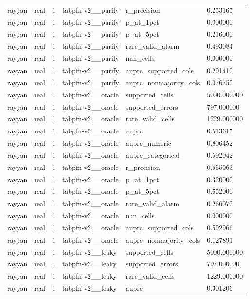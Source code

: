 \begin{tabular}{llllll}
rayyan & real & 1 & tabpfn-v2\_\_purify & r\_precision & 0.253165 \\
rayyan & real & 1 & tabpfn-v2\_\_purify & p\_at\_1pct & 0.000000 \\
rayyan & real & 1 & tabpfn-v2\_\_purify & p\_at\_5pct & 0.216000 \\
rayyan & real & 1 & tabpfn-v2\_\_purify & rare\_valid\_alarm & 0.493084 \\
rayyan & real & 1 & tabpfn-v2\_\_purify & nan\_cells & 0.000000 \\
rayyan & real & 1 & tabpfn-v2\_\_purify & auprc\_supported\_cols & 0.291410 \\
rayyan & real & 1 & tabpfn-v2\_\_purify & auprc\_nonmajority\_cols & 0.076752 \\
rayyan & real & 1 & tabpfn-v2\_\_oracle & supported\_cells & 5000.000000 \\
rayyan & real & 1 & tabpfn-v2\_\_oracle & supported\_errors & 797.000000 \\
rayyan & real & 1 & tabpfn-v2\_\_oracle & rare\_valid\_cells & 1229.000000 \\
rayyan & real & 1 & tabpfn-v2\_\_oracle & auprc & 0.513617 \\
rayyan & real & 1 & tabpfn-v2\_\_oracle & auprc\_numeric & 0.806452 \\
rayyan & real & 1 & tabpfn-v2\_\_oracle & auprc\_categorical & 0.592042 \\
rayyan & real & 1 & tabpfn-v2\_\_oracle & r\_precision & 0.655063 \\
rayyan & real & 1 & tabpfn-v2\_\_oracle & p\_at\_1pct & 0.320000 \\
rayyan & real & 1 & tabpfn-v2\_\_oracle & p\_at\_5pct & 0.652000 \\
rayyan & real & 1 & tabpfn-v2\_\_oracle & rare\_valid\_alarm & 0.266070 \\
rayyan & real & 1 & tabpfn-v2\_\_oracle & nan\_cells & 0.000000 \\
rayyan & real & 1 & tabpfn-v2\_\_oracle & auprc\_supported\_cols & 0.592966 \\
rayyan & real & 1 & tabpfn-v2\_\_oracle & auprc\_nonmajority\_cols & 0.127891 \\
rayyan & real & 1 & tabpfn-v2\_\_leaky & supported\_cells & 5000.000000 \\
rayyan & real & 1 & tabpfn-v2\_\_leaky & supported\_errors & 797.000000 \\
rayyan & real & 1 & tabpfn-v2\_\_leaky & rare\_valid\_cells & 1229.000000 \\
rayyan & real & 1 & tabpfn-v2\_\_leaky & auprc & 0.301206 \\

\end{tabular}
